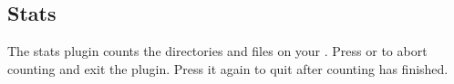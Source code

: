 \subsection{Stats}

The stats plugin counts the directories and files%
%
on your \dap{}.
Press \PluginCancel{} or \PluginExit{} to abort counting and%
exit the plugin. Press it again to quit after counting has%
finished.
